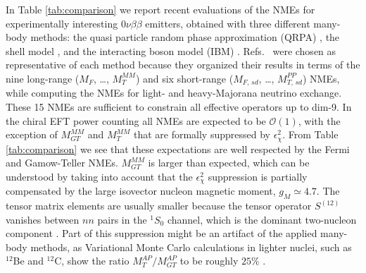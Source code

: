 \documentclass[letterpaper,11pt]{article}
\begin{document}
In Table \ref{tab:comparison} we report recent evaluations of the NMEs for experimentally interesting $0\nu\beta\beta$ emitters, 
obtained with three different many-body methods: the quasi particle random phase approximation (QRPA) \cite{Hyvarinen:2015bda}, the shell model  \cite{Menendez:2017fdf}, and the interacting boson model (IBM) \cite{Barea:2015kwa,Barea}.  
Refs.\  \cite{Hyvarinen:2015bda,Menendez:2017fdf,Barea:2015kwa,Barea}
were chosen as representative of each method because 
they organized their results in terms of the nine long-range 
($M_F$, \ldots, $M^{MM}_{T}$) and six short-range  ($M_{F,\, sd}$, \ldots, $M^{PP}_{T,\, sd}$) NMEs, while
computing the NMEs for light- and heavy-Majorana neutrino exchange. These 15 NMEs are sufficient to constrain all effective operators up to dim-9.
In the chiral EFT  power counting all NMEs are expected to be $\mathcal O(1)$, with the exception of $M^{MM}_{GT}$ and $M^{MM}_T$ that are formally suppressed by $\epsilon_\chi^2$.
From Table \ref{tab:comparison} we see that these expectations are well respected by the Fermi and Gamow-Teller NMEs. $M^{MM}_{GT}$ is larger than expected, which can be understood by taking into account that
the $\epsilon_\chi^2$ suppression is partially compensated by the large isovector nucleon magnetic moment, $g_M \simeq 4.7$. 
The tensor matrix elements are usually smaller because the tensor operator $S^{(12)}$ vanishes between $nn$ pairs in the $^1S_0$ channel, which is the dominant two-nucleon component  
\cite{Simkovic:2007vu}. Part of this suppression might be an artifact of the applied many-body methods, as Variational Monte Carlo calculations in lighter nuclei, such as $^{12}$Be and $^{12}$C,
show the ratio $M^{AP}_{T}/M^{AP}_{GT}$ to be roughly $25\%$ \cite{Pastore:2017ofx}. 
\end{document}
